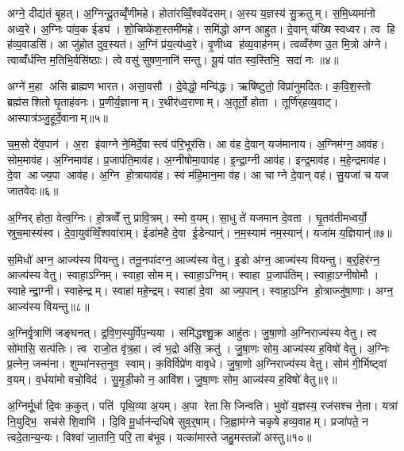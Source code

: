 अग्ने॒ दीद्य॑तं बृ॒हत्। अ॒ग्निन्दू॒तव्वृँ॑णीमहे। होता॑रव्विँ॒श्ववे॑दसम्। अ॒स्य य॒ज्ञस्य॑ सु॒क्रतुम्। स॒मि॒ध्यमा॑नो अध्व॒रे। अ॒ग्निः पा॑व॒क ईड्य॑। शो॒चिष्के॑श॒स्तमी॑महे। समि॑द्धो अग्न आहुत। दे॒वान् य॑ख्षि स्वध्वर। त्व हि ह॑व्य॒वाडसि॑। आ जु॑होत दुव॒स्यत॑। अ॒ग्निं प्र॑य॒त्य॑ध्व॒रे। वृ॒णीध्व ह॑व्य॒वाह॑नम्। त्वव्वँरु॑ण उ॒त मि॒त्रो अ॑ग्ने। त्वाव्वँ॑र्धन्ति म॒तिभि॒र्वसि॑ष्ठाः। त्वे वसु॑ सुषण॒नानि॑ सन्तु। यू॒यं पा॑त स्व॒स्तिभि॒ सदा॑ नः ॥४॥\anuvakamend[श्र॒वाय्य॑मिधीम॒ह्यसि॑ स॒प्त च॑]

अग्ने॑ म॒हा अ॑सि ब्राह्मण भारत। असा॒वसौ। दे॒वेद्धो॒ मन्वि॑द्धः। ऋषि॑ष्टुतो॒ विप्रा॑नुमदितः। क॒वि॒श॒स्तो ब्रह्म॑सशितो घृ॒ताह॑वनः। प्र॒णीर्य॒ज्ञानाम्। र॒थीर॑ध्व॒राणाम्। अ॒तूर्तो॒ होता। तूर्णि॑र्‌हव्य॒वाट्। आस्पात्र॑ञ्जु॒हूर्दे॒वानाम्॥५॥

च॒म॒सो दे॑व॒पान॑। अ॒रा इ॑वाग्ने ने॒मिर्दे॒वास्त्वं प॑रि॒भूर॑सि। आ व॑ह दे॒वान् यज॑मानाय। अ॒ग्निम॑ग्न॒ आव॑ह। सोम॒माव॑ह। अ॒ग्निमाव॑ह। प्र॒जाप॑ति॒माव॑ह। अ॒ग्नीषोमा॒वाव॑ह। इ॒न्द्रा॒ग्नी आव॑ह। इन्द्र॒माव॑ह। म॒हे॒न्द्रमाव॑ह। दे॒वा आज्य॒पा आव॑ह। अ॒ग्नि हो॒त्रायाव॑ह। स्वं म॑हि॒मान॒मा व॑ह। आ चाग्ने दे॒वान् वह॑। सु॒यजा॑ च यज जातवेदः॥६॥\anuvakamend[दे॒वाना॒मिन्द्र॒मा व॑ह॒ षट् च॑]

अ॒ग्निर् होता॒ वेत्व॒ग्निः। हो॒त्रव्वेँत्तु प्रावि॒त्रम्। स्मो व॒यम्। सा॒धु ते॑ यजमान दे॒वता। घृ॒तव॑तीमध्वर्यो॒ स्रुच॒मास्य॑स्व। दे॒वा॒युव॑व्विँ॒श्ववा॑राम्। ईडा॑महै दे॒वा ई॒डेन्यान्॑। न॒म॒स्याम॑ नम॒स्यान्॑। यजा॑म य॒ज्ञियान्॑॥७॥\anuvakamend[अ॒ग्निर्‌होता॒ नव॑]

स॒मिधो॑ अग्न॒ आज्य॑स्य वियन्तु। तनू॒नपा॑दग्न॒ आज्य॑स्य वेतु। इ॒डो अ॑ग्न॒ आज्य॑स्य वियन्तु। ब॒र्॒हिर॑ग्न॒ आज्य॑स्य वेतु। स्वाहा॒ऽग्निम्। स्वाहा॒ सोमम्। स्वाहा॒ऽग्निम्। स्वाहा प्र॒जाप॑तिम्। स्वाहा॒ऽग्नीषोमौ। स्वाहेन्द्रा॒ग्नी। स्वाहेन्द्रम्। स्वाहा॑ महे॒न्द्रम्। स्वाहा॑ दे॒वा आज्य॒पान्। स्वाहा॒ऽग्नि हो॒त्राज्जु॑षा॒णाः। अग्न॒ आज्य॑स्य वियन्तु॥८॥\anuvakamend[इ॒न्द्रा॒ग्नी पञ्च॑ च]

अ॒ग्निर्वृ॒त्राणि॑ जङ्घनत्। द्र॒वि॒ण॒स्युर्वि॑प॒न्यया। समि॑द्धश्शु॒क्र आहु॑तः। जु॒षा॒णो अ॒ग्निराज्य॑स्य वेतु। त्व सो॑मासि॒ सत्प॑तिः। त्व राजो॒त वृ॑त्र॒हा। त्वं भ॒द्रो अ॑सि॒ क्रतु॑। जु॒षा॒णः सोम॒ आज्य॑स्य ह॒विषो॑ वेतु। अ॒ग्निः प्र॒त्नेन॒ जन्म॑ना। शुम्भा॑नस्त॒नुव॒ स्वाम्। क॒विर्विप्रे॑ण वावृधे। जु॒षा॒णो अ॒ग्निराज्य॑स्य वेतु। सोम॑ गी॒र्भिष्ट्वा॑ व॒यम्। व॒र्धया॑मो वचो॒विद॑। सु॒मृ॒डी॒को न॒ आवि॑श। जु॒षा॒णः सोम॒ आज्य॑स्य ह॒विषो॑ वेतु॥९॥\anuvakamend[स्वा षट् च॑]

अ॒ग्निर्मू॒र्धा दि॒वः क॒कुत्। पति॑ पृथि॒व्या अ॒यम्। अ॒पा रेतासि जिन्वति। भुवो॑ य॒ज्ञस्य॒ रज॑सश्च ने॒ता। यत्रा॑ नि॒युद्भि॒ सच॑से शि॒वाभि॑। दि॒वि मू॒र्धान॑न्दधिषे सुव॒र्॒षाम्। जि॒ह्वाम॑ग्ने चकृषे हव्य॒वाहम्। प्रजा॑पते॒ न त्वदे॒तान्य॒न्यः। विश्वा॑ जा॒तानि॒ परि॒ ता ब॑भूव। यत्का॑मास्ते जहु॒मस्तन्नो॑ अस्तु॥१०॥

